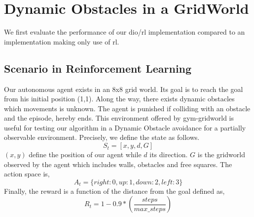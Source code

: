 \section{Dynamic Obstacles in a GridWorld} 
We first evaluate the performance of our dio/rl implementation compared to an implementation making only use of rl. 
\subsection{Scenario in Reinforcement Learning}
Our autonomous agent exists in an 8x8 grid world. Its goal is to reach the goal from his initial position (1,1).
Along the way, there exists dynamic obstacles which movements is unknown. The agent is punished if colliding with an obstacle and the episode, hereby ends. 
This environment offered by gym-gridworld \cite{gym_minigrid} is useful for testing our algorithm in a Dynamic Obstacle avoidance for a partially observable 
environment. Precisely, we define the state as follows. 
\begin{equation*}
  S_t = [x, y, d, G]
\end{equation*}
$(x,y)$ define the position of our agent while $d$ its direction. $G$ is the gridworld observed by the agent which includes walls, obstacles and free squares. 
The action space is, 
\begin{equation*}
  A_t = \{ right: 0, up: 1, down: 2, left: 3 \}
\end{equation*}
Finally, the reward is a function of the distance from the goal defined as, 
\begin{equation*}
  R_t = 1 - 0.9*(\dfrac{steps}{max\_steps})
\end{equation*}

